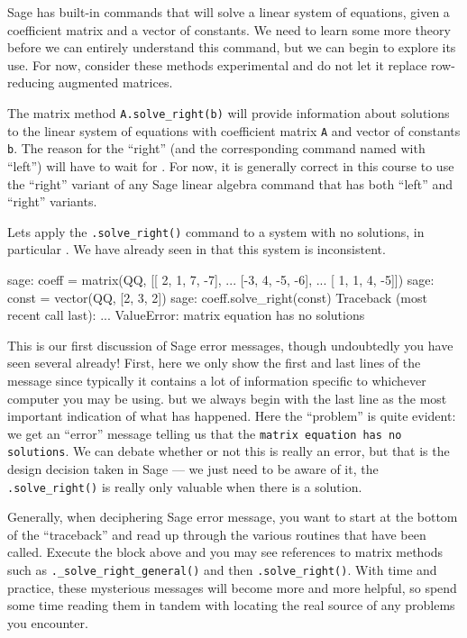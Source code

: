 Sage has built-in commands that will solve a linear system of equations, given a coefficient matrix and a vector of constants.  We need to learn some more theory before we can entirely understand this command, but we can begin to explore its use.  For now, consider these methods experimental and do not let it replace row-reducing augmented matrices.\par
%
The matrix method \verb?A.solve_right(b)? will provide information about solutions to the linear system of equations with coefficient matrix \verb?A? and vector of constants \verb?b?.  The reason for the ``right'' (and the corresponding command named with ``left'') will have to wait for .  For now, it is generally correct in this course to use the ``right'' variant of any Sage linear algebra command that has both ``left'' and ``right'' variants.\par
%
Lets apply the \verb?.solve_right()? command to a system with no solutions, in particular .  We have already seen in  that this system is inconsistent.
%
\begin{sageexample}
sage: coeff = matrix(QQ, [[ 2, 1,  7, -7],
...                       [-3, 4, -5, -6],
...                       [ 1, 1,  4, -5]])
sage: const = vector(QQ, [2, 3, 2])
sage: coeff.solve_right(const)
Traceback (most recent call last):
...
ValueError: matrix equation has no solutions
\end{sageexample}
%
This is our first discussion of Sage error messages, though undoubtedly you have seen several already!  First, here we only show the first and last lines of the message since typically it contains a lot of information specific to whichever computer you may be using.  but we always begin with the last line as the most important indication of what has happened.  Here the ``problem'' is quite evident: we get an ``error'' message telling us that the \texttt{matrix equation has no solutions}.  We can debate whether or not this is really an error, but that is the design decision taken in Sage --- we just need to be aware of it, the \verb?.solve_right()? is really only valuable when there is a solution.\par
%
Generally, when deciphering Sage error message, you want to start at the bottom of the ``traceback'' and read up through the various routines that have been called.  Execute the block above and you may see references to matrix methods such as \verb?._solve_right_general()? and then \verb?.solve_right()?.  With time and practice, these mysterious messages will become more and more helpful, so spend some time reading them in tandem with locating the real source of any problems you encounter.\par
